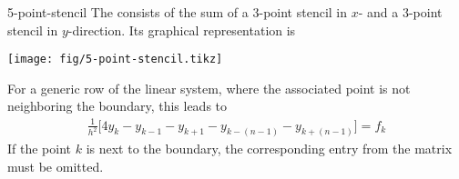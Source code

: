 \begin{Definition}{5-point-stencil}
  The  consists of the sum of a 3-point
  stencil in $x$- and a 3-point stencil in $y$-direction. Its
  graphical representation is
  \begin{center}
    \texttt{[image: fig/5-point-stencil.tikz]}
  \end{center}
  For a generic row of the linear system, where the associated point is not
  neighboring the boundary, this leads to
  \begin{gather}
    \label{eq:5-point-stencil:1}
    \frac1{h^2}\bigl[4y_k - y_{k-1} - y_{k+1} - y_{k-(n-1)} -
    y_{k+(n-1)}\bigr] = f_k
  \end{gather}
  If the point $k$ is next to the boundary, the corresponding entry
  from the matrix must be omitted.
\end{Definition}

